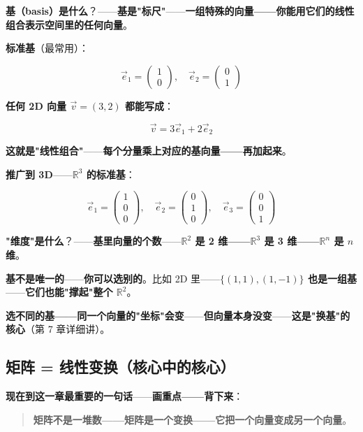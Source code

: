 \textbf{基（basis）是什么}？——\textbf{基是"标尺"}——\textbf{一组特殊的向量——你能用它们的线性组合表示空间里的任何向量}。

\textbf{标准基}（最常用）：

\[
\vec{e}_1 = \begin{pmatrix} 1 \\ 0 \end{pmatrix}, \quad
\vec{e}_2 = \begin{pmatrix} 0 \\ 1 \end{pmatrix}
\]

\textbf{任何 2D 向量 $\vec{v} = (3, 2)$ 都能写成}：

\[
\vec{v} = 3 \vec{e}_1 + 2 \vec{e}_2
\]

\textbf{这就是"线性组合"}——\textbf{每个分量乘上对应的基向量——再加起来}。

\textbf{推广到 3D}——\textbf{$\mathbb{R}^3$ 的标准基}：

\[
\vec{e}_1 = \begin{pmatrix} 1 \\ 0 \\ 0 \end{pmatrix}, \quad
\vec{e}_2 = \begin{pmatrix} 0 \\ 1 \\ 0 \end{pmatrix}, \quad
\vec{e}_3 = \begin{pmatrix} 0 \\ 0 \\ 1 \end{pmatrix}
\]

\textbf{"维度"是什么}？——\textbf{基里向量的个数}——\textbf{$\mathbb{R}^2$ 是 2 维——$\mathbb{R}^3$ 是 3 维——$\mathbb{R}^n$ 是 $n$ 维}。

\textbf{基不是唯一的}——\textbf{你可以选别的}。比如 2D 里——\textbf{$\{(1,1), (1,-1)\}$ 也是一组基}——\textbf{它们也能"撑起"整个 $\mathbb{R}^2$}。

\textbf{选不同的基——同一个向量的"坐标"会变}——\textbf{但向量本身没变}——\textbf{这是"换基"的核心}（第 7 章详细讲）。

\subsection{矩阵 = 线性变换（核心中的核心）}

\textbf{现在到这一章最重要的一句话}——\textbf{画重点——背下来}：

\begin{quote}
\textbf{矩阵不是一堆数——矩阵是一个变换——它把一个向量变成另一个向量}。
\end{quote}

